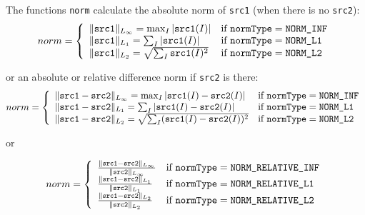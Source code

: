 \begin{description}
\end{description}

The functions \texttt{norm} calculate the absolute norm of \texttt{src1} (when there is no \texttt{src2}):
\[
norm = \left\{ \begin{array}{l l} \|\texttt{src1}\|_{L_{\infty}}    = \max_I |\texttt{src1}(I)| & \mbox{if $\texttt{normType} = \texttt{NORM\_INF}$}\\ \|\texttt{src1}\|_{L_1} = \sum_I |\texttt{src1}(I)| & \mbox{if $\texttt{normType} = \texttt{NORM\_L1}$}\\ \|\texttt{src1}\|_{L_2} = \sqrt{\sum_I \texttt{src1}(I)^2} & \mbox{if $\texttt{normType} = \texttt{NORM\_L2}$}\\ \end{array} \right.
\]

or an absolute or relative difference norm if \texttt{src2} is there:
\[
norm = \left\{ \begin{array}{l l} \|\texttt{src1}-\texttt{src2}\|_{L_{\infty}}    = \max_I |\texttt{src1}(I) - \texttt{src2}(I)| & \mbox{if $\texttt{normType} = \texttt{NORM\_INF}$}\\ \|\texttt{src1}-\texttt{src2}\|_{L_1} = \sum_I |\texttt{src1}(I) - \texttt{src2}(I)| & \mbox{if $\texttt{normType} = \texttt{NORM\_L1}$}\\ \|\texttt{src1}-\texttt{src2}\|_{L_2} = \sqrt{\sum_I (\texttt{src1}(I) - \texttt{src2}(I))^2} & \mbox{if $\texttt{normType} = \texttt{NORM\_L2}$}\\ \end{array} \right.
\]

or

\[
norm = \left\{ \begin{array}{l l} \frac{\|\texttt{src1}-\texttt{src2}\|_{L_{\infty}}    }{\|\texttt{src2}\|_{L_{\infty}}   } & \mbox{if $\texttt{normType} = \texttt{NORM\_RELATIVE\_INF}$}\\ \frac{\|\texttt{src1}-\texttt{src2}\|_{L_1} }{\|\texttt{src2}\|_{L_1}} & \mbox{if $\texttt{normType} = \texttt{NORM\_RELATIVE\_L1}$}\\ \frac{\|\texttt{src1}-\texttt{src2}\|_{L_2} }{\|\texttt{src2}\|_{L_2}} & \mbox{if $\texttt{normType} = \texttt{NORM\_RELATIVE\_L2}$}\\ \end{array} \right.
\]

